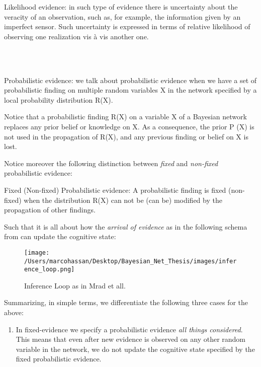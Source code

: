 \documentclass[11pt]{article}
\begin{document}
\begin{article}
\begin{definition}
Likelihood evidence: in such type of evidence there is uncertainty
about the veracity of an observation, such as, for example, the
information given by an imperfect sensor. Such uncertainty is
expressed in terms of relative likelihood of observing one
realization vis à vis another one. 
\end{definition}

\\\\

\begin{definition}
Probabilistic evidence: we talk about probabilistic evidence when we
have a set of probabilistic finding on multiple random variables X in the network
specified by a local probability distribution R(X).
\end{definition}  

Notice that a probabilistic finding R(X) on a variable X of a
Bayesian network replaces any prior belief or knowledge on X. As a
consequence, the prior P (X) is not used in the propagation of R(X),
and any previous finding or belief on X is lost.

Notice moreover the following distinction between \emph{fixed} and
\emph{non-fixed} probabilistic evidence:

\begin{definition}
Fixed (Non-fixed) Probabilistic evidence: A probabilistic finding
is fixed (non-fixed) when the distribution R(X) can not be (can
be) modified by the propagation of other findings.
\end{definition}  

Such that it is all about how the \emph{arrival of evidence} as in the
following schema from \cite{Mrad_2015} can update the cognitive state:

\begin{figure}[htbp]
\centering
\texttt{[image: /Users/marcohassan/Desktop/Bayesian\_Net\_Thesis/images/inference\_loop.png]}
\caption{Inference Loop as in Mrad et all.}
\end{figure}


Summarizing, in simple terms, we differentiate the following three
cases for the above:

\begin{enumerate}
\item In fixed-evidence we specify a probabilistic evidence \emph{all things
considered}. This means that even after new evidence is observed
on any other random variable in the network, we do not update the
cognitive state specified by the fixed probabilistic evidence.


\end{enumerate}
\end{article}
\end{document}
